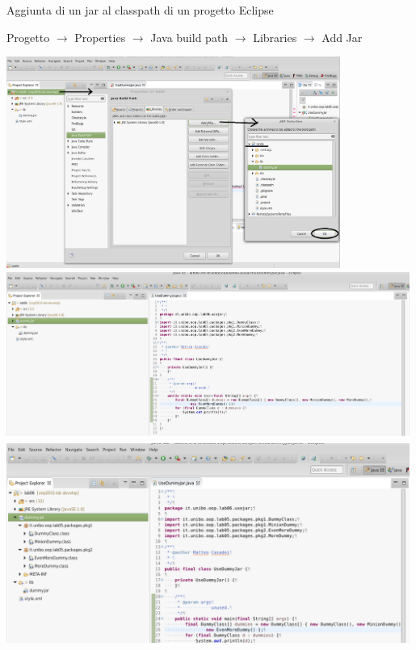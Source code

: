 \documentclass[presentation]{beamer}
\begin{document}
\begin{frame}[allowframebreaks]{Aggiunta di un jar al classpath di un progetto Eclipse}
	\begin{block}{}
		Progetto $\rightarrow$ Properties $\rightarrow$ Java build path $\rightarrow$ Libraries 
$\rightarrow$ Add Jar
	\end{block}
	\begin{center}
		\includegraphics[width=0.82\textwidth]{img/addjar-1} \\
		\includegraphics[width=0.99\textwidth]{img/addjar-2} \\
		\includegraphics[width=0.99\textwidth]{img/addjar-3} \\
	\end{center}
\end{frame}
\end{document}

